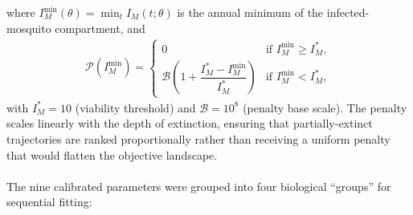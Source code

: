 \documentclass[a4paper,fleqn]{cas-dc}
\begin{document}
where $I_M^{\min}(\theta) = \min_{t} I_M(t;\theta)$ is the annual minimum of the infected-mosquito compartment, and
\begin{align}
\mathcal{P}\!\left(I_M^{\min}\right) = \begin{cases}
0 & \text{if } I_M^{\min} \geq I_M^*, \\[4pt]
\mathcal{B} \left(1 + \dfrac{I_M^* - I_M^{\min}}{I_M^*}\right) & \text{if } I_M^{\min} < I_M^*,
\end{cases}
\label{eq:penalty}
\end{align}
with $I_M^* = 10$ (viability threshold) and $\mathcal{B} = 10^8$ (penalty base scale). The penalty scales linearly with the depth of extinction, ensuring that partially-extinct trajectories are ranked proportionally rather than receiving a uniform penalty that would flatten the objective landscape.
\\\\
The nine calibrated parameters were grouped into four biological ``groups'' for sequential fitting:
\end{document}
